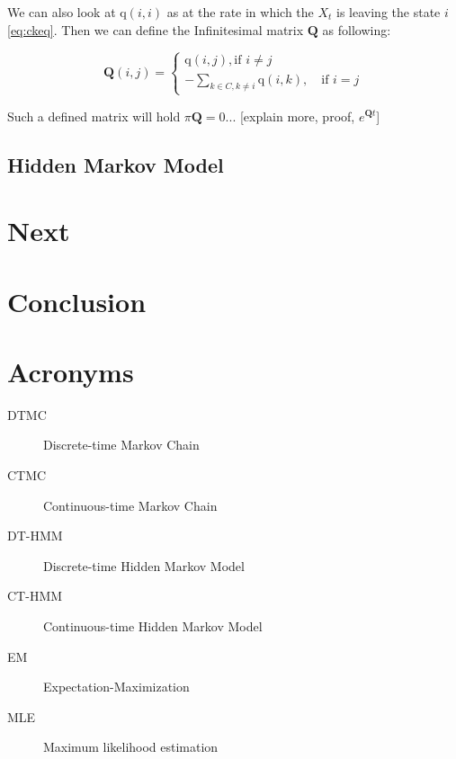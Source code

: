 \documentclass[thesis=M,english]{FITthesis}[2012/10/20]
\newcommand{\matr}[1]{\mathbf{#1}}
\begin{document}
We can also look at $\mathrm{q}(i,i)$ as at the rate in which the $X_t$ is leaving the state $i$ \eqref{eq:ckeq}. Then we can define the Infinitesimal matrix $\matr{Q}$ as following:

\begin{equation}  
\matr{Q}(i,j)= 
\begin{cases}
\mathrm{q}(i,j), \text{if } i\neq j\\
- \sum_{k \in C ,k \neq i} \mathrm{q}(i,k), \quad \text{if } i=j
\end{cases}
\end{equation}

Such a defined matrix will hold $\pi\matr{Q} = 0$... [explain more, proof, $e^{\matr{Q}t}$]

\section{Hidden Markov Model}


\chapter{Next}



\chapter{Conclusion}





\appendix

\chapter{Acronyms}
\begin{description}
	\item[DTMC] Discrete-time Markov Chain	
	\item[CTMC] Continuous-time Markov Chain
	\item[DT-HMM] Discrete-time Hidden Markov Model
	\item[CT-HMM] Continuous-time Hidden Markov Model
	\item[EM] Expectation-Maximization 
	\item[MLE] Maximum likelihood estimation
\end{description}
\end{document}
